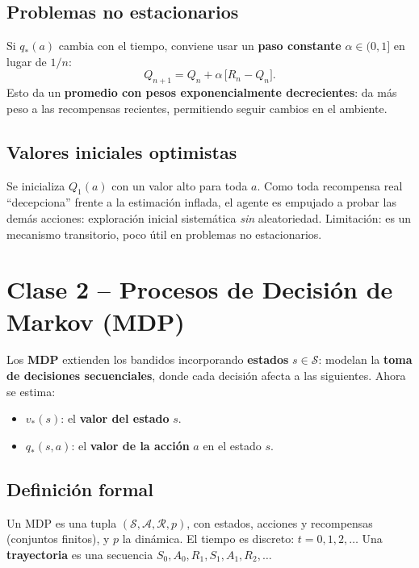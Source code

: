 \documentclass[11pt, a4paper]{article}
\begin{document}
\subsection{Problemas no estacionarios}
Si $q_*(a)$ cambia con el tiempo, conviene usar un \textbf{paso constante} $\alpha \in (0,1]$ en lugar de $1/n$:
\[
    Q_{n+1} = Q_n + \alpha\,\big[R_n - Q_n\big].
\]
Esto da un \textbf{promedio con pesos exponencialmente decrecientes}: da m\'as peso a las recompensas recientes, permitiendo seguir cambios en el ambiente.

\subsection{Valores iniciales optimistas}
Se inicializa $Q_1(a)$ con un valor alto para toda $a$. Como toda recompensa real ``decepciona'' frente a la estimaci\'on inflada, el agente es empujado a probar las dem\'as acciones: exploraci\'on inicial sistem\'atica \emph{sin} aleatoriedad. Limitaci\'on: es un mecanismo transitorio, poco \'util en problemas no estacionarios.

\section{Clase 2 -- Procesos de Decisi\'on de Markov (MDP)}

Los \textbf{MDP} extienden los bandidos incorporando \textbf{estados} $s \in \mathcal{S}$: modelan la \textbf{toma de decisiones secuenciales}, donde cada decisi\'on afecta a las siguientes. Ahora se estima:
\begin{itemize}[nosep]
    \item $v_*(s)$: el \textbf{valor del estado} $s$.
    \item $q_*(s,a)$: el \textbf{valor de la acci\'on} $a$ en el estado $s$.
\end{itemize}

\subsection{Definici\'on formal}
Un MDP es una tupla $(\mathcal{S}, \mathcal{A}, \mathcal{R}, p)$, con estados, acciones y recompensas (conjuntos finitos), y $p$ la din\'amica. El tiempo es discreto: $t = 0,1,2,\dots$ Una \textbf{trayectoria} es una secuencia $S_0, A_0, R_1, S_1, A_1, R_2, \dots$
\end{document}
